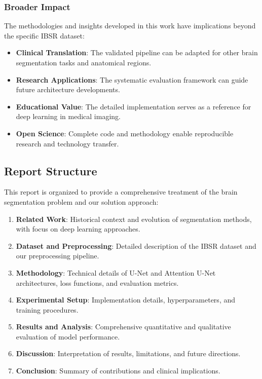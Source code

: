 \documentclass[12pt,a4paper]{article}
\begin{document}
\subsubsection{Broader Impact}
The methodologies and insights developed in this work have implications beyond the specific IBSR dataset:

\begin{itemize}
    \item \textbf{Clinical Translation}: The validated pipeline can be adapted for other brain segmentation tasks and anatomical regions.
    \item \textbf{Research Applications}: The systematic evaluation framework can guide future architecture developments.
    \item \textbf{Educational Value}: The detailed implementation serves as a reference for deep learning in medical imaging.
    \item \textbf{Open Science}: Complete code and methodology enable reproducible research and technology transfer.
\end{itemize}

\subsection{Report Structure}

This report is organized to provide a comprehensive treatment of the brain segmentation problem and our solution approach:

\begin{enumerate}
    \item \textbf{Related Work}: Historical context and evolution of segmentation methods, with focus on deep learning approaches.
    \item \textbf{Dataset and Preprocessing}: Detailed description of the IBSR dataset and our preprocessing pipeline.
    \item \textbf{Methodology}: Technical details of U-Net and Attention U-Net architectures, loss functions, and evaluation metrics.
    \item \textbf{Experimental Setup}: Implementation details, hyperparameters, and training procedures.
    \item \textbf{Results and Analysis}: Comprehensive quantitative and qualitative evaluation of model performance.
    \item \textbf{Discussion}: Interpretation of results, limitations, and future directions.
    \item \textbf{Conclusion}: Summary of contributions and clinical implications.
\end{enumerate}
\end{document}
